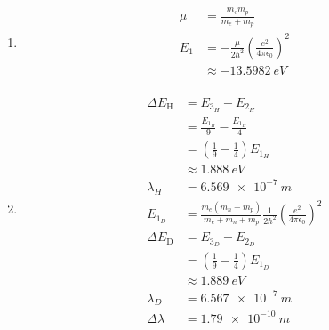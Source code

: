 \documentclass{article}
\begin{document}
\subsection{}

\begin{enumerate}
  \item

        \begin{align*}
          \mu & = \frac{m_e m_p}{m_e + m_p}                                            \\
          E_1 & = -\frac{\mu}{2 \hbar^2} \left( \frac{e^2}{4 \pi \epsilon_0} \right)^2 \\
              & \approx \qty{-13.5982}{eV}                                             \\
        \end{align*}

  \item

        \begin{align*}
          \Delta E_\text{H} & = E_{3_H} - E_{2_H}                                                                                         \\
                            & = \frac{E_{1_H}}{9} - \frac{E_{1_H}}{4}                                                                     \\
                            & = \left( \frac{1}{9} - \frac{1}{4} \right) E_{1_H}                                                          \\
                            & \approx \qty{1.888}{eV}                                                                                     \\
          \lambda_H         & = \qty{6.569e-7}{m}                                                                                         \\
          E_{1_D}           & = \frac{m_e (m_n + m_p)}{m_e + m_n + m_p} \frac{1}{2 \hbar^2} \left( \frac{e^2}{4 \pi \epsilon_0} \right)^2 \\
          \Delta E_\text{D} & = E_{3_D} - E_{2_D}                                                                                         \\
                            & = \left( \frac{1}{9} - \frac{1}{4} \right) E_{1_D}                                                          \\
                            & \approx \qty{1.889}{eV}                                                                                     \\
          \lambda_D         & = \qty{6.567e-7}{m}                                                                                         \\
          \Delta \lambda    & = \qty{1.79e-10}{m}
        \end{align*}


\end{enumerate}
\end{document}
